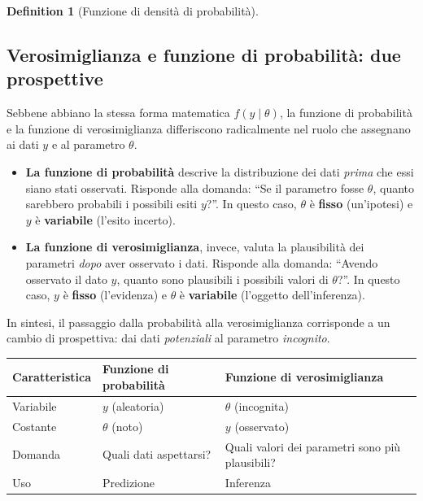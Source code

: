 \documentclass[
  letterpaper,
  DIV=11,
  numbers=noendperiod,
  oneside]{scrreprt}
\providecommand{\tightlist}{%
  \setlength{\itemsep}{0pt}\setlength{\parskip}{0pt}}
\theoremstyle{definition}
\theoremstyle{plain}
\theoremstyle{definition}
\newtheorem{definition}{Definition}[chapter]
\theoremstyle{remark}
\begin{document}
\begin{definition}[Funzione di densità di
probabilità]
\subsection{Verosimiglianza e funzione di probabilità: due
prospettive}\label{verosimiglianza-e-funzione-di-probabilituxe0-due-prospettive}

Sebbene abbiano la stessa forma matematica \(f(y \mid \theta)\), la
funzione di probabilità e la funzione di verosimiglianza differiscono
radicalmente nel ruolo che assegnano ai dati \(y\) e al parametro
\(\theta\).

\begin{itemize}
\tightlist
\item
  \textbf{La funzione di probabilità} descrive la distribuzione dei dati
  \emph{prima} che essi siano stati osservati. Risponde alla domanda:
  ``Se il parametro fosse \(\theta\), quanto sarebbero probabili i
  possibili esiti \(y\)?''. In questo caso, \(\theta\) è \textbf{fisso}
  (un'ipotesi) e \(y\) è \textbf{variabile} (l'esito incerto).
\item
  \textbf{La funzione di verosimiglianza}, invece, valuta la
  plausibilità dei parametri \emph{dopo} aver osservato i dati. Risponde
  alla domanda: ``Avendo osservato il dato \(y\), quanto sono plausibili
  i possibili valori di \(\theta\)?''. In questo caso, \(y\) è
  \textbf{fisso} (l'evidenza) e \(\theta\) è \textbf{variabile}
  (l'oggetto dell'inferenza).
\end{itemize}

In sintesi, il passaggio dalla probabilità alla verosimiglianza
corrisponde a un cambio di prospettiva: dai dati \emph{potenziali} al
parametro \emph{incognito}.

\begin{longtable}[]{@{}
  >{\raggedright\arraybackslash}p{}
  >{\raggedright\arraybackslash}p{}
  >{\raggedright\arraybackslash}p{}@{}}
\toprule\noalign{}
\begin{minipage}[b]{\linewidth}\raggedright
Caratteristica
\end{minipage} & \begin{minipage}[b]{\linewidth}\raggedright
Funzione di probabilità
\end{minipage} & \begin{minipage}[b]{\linewidth}\raggedright
Funzione di verosimiglianza
\end{minipage} \\
\midrule\noalign{}
\endhead
\bottomrule\noalign{}
\endlastfoot
Variabile & \(y\) (aleatoria) & \(\theta\) (incognita) \\
Costante & \(\theta\) (noto) & \(y\) (osservato) \\
Domanda & Quali dati aspettarsi? & Quali valori dei parametri sono più
plausibili? \\
Uso & Predizione & Inferenza \\
\end{longtable}


\end{definition}
\end{document}
